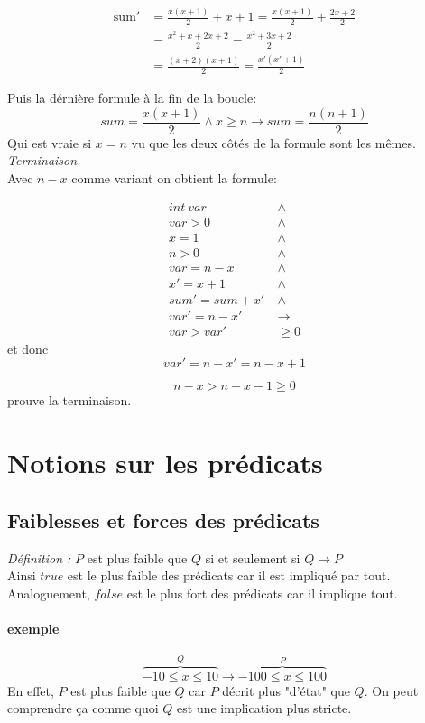 \documentclass[12pt]{article}
\begin{document}
\begin{align*}
    \text{sum}' &= \frac{x(x+1)}{2} + x + 1 = \frac{x(x+1)}{2} + \frac{2x + 2}{2}\\
    &= \frac{x^{2} + x +2x + 2}{2} = \frac{x^{2} + 3x +2}{2}\\
    &= \frac{(x+2)(x+1)}{2} = \frac{x'(x'+ 1)}{2}
\end{align*}

Puis la dérnière formule à la fin de la boucle:
\[
  sum = \frac{x(x+1)}{2} \wedge x \geq n \to sum = \frac{n(n+1)}{2}
\]
Qui est vraie si \(x = n\) vu que les deux côtés de la formule sont les mêmes.
\emph{Terminaison}\\
Avec $n-x$ comme variant on obtient la formule:

\begin{align*}
   int\ var\ &\wedge \\
   var > 0\ &\wedge \\
   x = 1\ &\wedge \\
   n > 0\ &\wedge \\
   var = n - x\ &\wedge \\
   x' = x + 1\ &\wedge \\
   sum' = sum + x'\ &\wedge \\
  var' = n - x'\ &\to \\
  var > var' &\geq 0
\end{align*}
et donc
\[
  var' = n - x' = n - x + 1
\]

\[
  n - x > n - x - 1 \geq 0
\]
prouve la terminaison.

\section*{Notions sur les prédicats}
\subsection*{Faiblesses et forces des prédicats}
\emph{Définition :} $P$ est plus faible que $Q$ si et seulement si $Q \to P$\\
Ainsi $true$ est le plus faible des prédicats car il est impliqué par tout. Analoguement,
$false$ est le plus fort des prédicats car il implique tout.
\paragraph*{exemple}

\[\overbrace{-10 \leq x \leq 10}^Q \to \overbrace{-100 \leq x \leq 100}^{P}\]
En effet, $P$ est plus faible que $Q$ car $P$ décrit plus "d'état" que $Q$.
On peut comprendre ça comme quoi $Q$ est une implication plus stricte.
\end{document}
